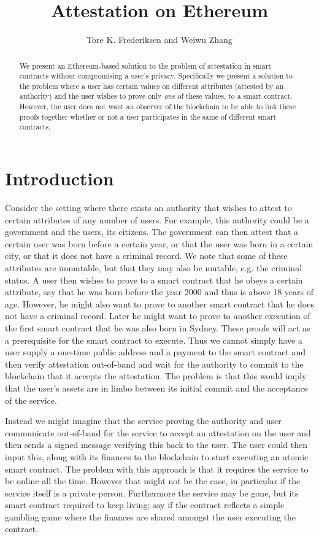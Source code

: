 \documentclass[11pt]{article} %
\author{Tore K. Frederiksen and Weiwu Zhang} \title{Attestation on Ethereum}
\begin{document}
\maketitle
\begin{abstract}
We present an Ethereum-based solution to the problem of attestation in smart contracts without compromising a user's privacy. Specifically we present a solution to the problem where a user has certain values on different attributes (attested by an authority) and the user wishes to prove only \emph{one} of these values, to a smart contract. However, the user does not want an observer of the blockchain to be able to link these proofs together whether or not a user participates in the same of different smart contracts.
\end{abstract}


\section{Introduction}
Consider the setting where there exists an authority that wishes to attest to certain attributes of any number of users. For example, this authority could be a government and the users, its citizens. The government can then attest that a certain user was born before a certain year, or that the user was born in a certain city, or that it does not have a criminal record. We note that some of these attributes are immutable, but that they may also be mutable, e.g. the criminal status. A user then wishes to prove to a smart contract that he obeys a certain attribute, say that he was born before the year 2000 and thus is above 18 years of age. However, he might also want to prove to another smart contract that he does not have a criminal record. Later he might want to prove to another execution of the first smart contract that he was also born in Sydney. These proofs will act as a prerequisite for the smart contract to execute.
Thus we cannot simply have a user supply a one-time public address and a payment to the smart contract and then verify attestation out-of-band and wait for the authority to commit to the blockchain that it accepts the attestation. The problem is that this would imply that the user's assets are in limbo between its initial commit and the acceptance of the service. 

Instead we might imagine that the service proving the authority and user communicate out-of-band for the service to accept an attestation on the user and then sends a signed message verifying this back to the user. The user could then input this, along with its finances to the blockchain to start executing an atomic smart contract. The problem with this approach is that it requires the service to be online all the time. However that might not be the case, in particular if the service itself is a private person. Furthermore the service may be gone, but its smart contract required to keep living; say if the contract reflects a simple gambling game where the finances are shared amongst the user executing the contract.
\end{document}
